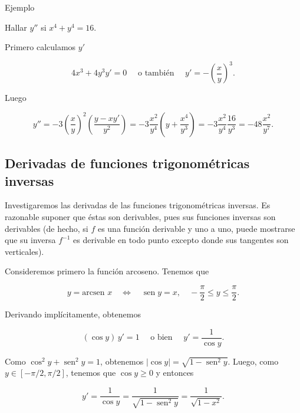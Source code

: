 \documentclass[
  letterpaper,
]{book}
\theoremstyle{plain}
\theoremstyle{remark}
\begin{document}
Ejemplo

Hallar \(y''\) si \(x^4+y^4=16\).

\begin{tcolorbox}[enhanced jigsaw, opacityback=0, left=2mm, opacitybacktitle=0.6, toprule=.15mm, bottomrule=.15mm, colbacktitle=quarto-callout-tip-color!10!white, titlerule=0mm, bottomtitle=1mm, title=\textcolor{quarto-callout-tip-color}{\faLightbulb}\hspace{0.5em}{Solución}, toptitle=1mm, colframe=quarto-callout-tip-color-frame, colback=white, breakable, rightrule=.15mm, arc=.35mm, leftrule=.75mm, coltitle=black]

Primero calculamos \(y'\)

\[
4x^3+4y^3y'=0 \quad \text{ o también } \quad y'=-\left(\frac{x}{y}\right)^3.
\]

Luego

\[
y''=-3\left(\frac{x}{y}\right)^{2}\left(\frac{y-xy'}{y^2}\right)=-3\frac{x^2}{y^4}\left(y+\frac{x^4}{y^3}\right)=-3\frac{x^2}{y^4}\frac{16}{y^3}=-48 \frac{x^2}{y^7}.
\]

\end{tcolorbox}

\subsection{Derivadas de funciones trigonométricas
inversas}\label{derivadas-de-funciones-trigonomuxe9tricas-inversas}

Investigaremos las derivadas de las funciones trigonométricas inversas.
Es razonable suponer que éstas son derivables, pues sus funciones
inversas son derivables (de hecho, si \(f\) es una función derivable y
uno a uno, puede mostrarse que su inversa \(f^{-1}\) es derivable en
todo punto excepto donde sus tangentes son verticales).

Consideremos primero la función arcoseno. Tenemos que

\[
y=\text{arcsen } x \quad\Longleftrightarrow\quad \operatorname{sen} y=x,\quad -\frac{\pi}{2}\leq y\leq \frac{\pi}{2}.
\]

Derivando implícitamente, obtenemos

\[
(\cos y)\, y'=1\quad \text{ o bien }\quad y'=\frac{1}{\cos y}.
\]

Como \(\cos^2y+\operatorname{sen}^2y=1\), obtenemos
\(|\cos y|=\sqrt{1-\operatorname{sen}^2 y}\). Luego, como
\(y\in[-\pi/2,\pi/2]\), tenemos que \(\cos y\geq 0\) y entonces

\[
y'=\frac{1}{\cos y}=\frac{1}{\sqrt{1-\operatorname{sen}^2 y}}=\frac{1}{\sqrt{1-x^2 }}.
\]
\end{document}
